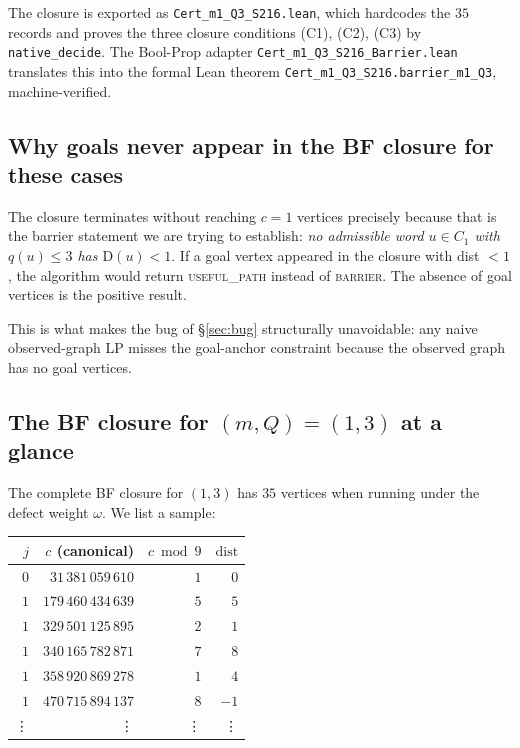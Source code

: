 \documentclass[11pt,a4paper]{article}
\theoremstyle{plain}
\theoremstyle{definition}
\newcommand{\defect}{\mathrm{D}}
\begin{document}
The closure is exported as
\texttt{Cert\_m1\_Q3\_S216.lean}, which hardcodes the $35$
records and proves the three closure conditions (C1), (C2), (C3)
by \texttt{native\_decide}. The Bool-Prop adapter
\texttt{Cert\_m1\_Q3\_S216\_Barrier.lean} translates this into
the formal Lean theorem
\texttt{Cert\_m1\_Q3\_S216.barrier\_m1\_Q3}, machine-verified.

\subsection{Why goals never appear in the BF closure for these cases}

The closure terminates without reaching $c = 1$ vertices precisely
because that is the barrier statement we are trying to establish:
\emph{no admissible word $u \in C_1$ with $q(u) \le 3$ has
$\defect(u) < 1$}. If a goal vertex appeared in the closure with
dist $< 1$, the algorithm would return \textsc{useful\_path}
instead of \textsc{barrier}. The absence of goal vertices is the
positive result.

This is what makes the bug of \S\ref{sec:bug} structurally
unavoidable: any naive observed-graph LP misses the goal-anchor
constraint because the observed graph has no goal vertices.

\subsection{The BF closure for $(m, Q) = (1, 3)$ at a glance}

The complete BF closure for $(1, 3)$ has $35$ vertices when
running under the defect weight $\omega$. We list a sample:

\begin{center}\footnotesize
\begin{tabular}{rrrr}
\toprule
$j$ & $c$ (canonical) & $c \bmod 9$ & $\mathrm{dist}$ \\
\midrule
$0$ & $31\,381\,059\,610$ & $1$ & $0$ \\
$1$ & $179\,460\,434\,639$ & $5$ & $5$ \\
$1$ & $329\,501\,125\,895$ & $2$ & $1$ \\
$1$ & $340\,165\,782\,871$ & $7$ & $8$ \\
$1$ & $358\,920\,869\,278$ & $1$ & $4$ \\
$1$ & $470\,715\,894\,137$ & $8$ & $-1$ \\
\vdots & \vdots & \vdots & \vdots \\
\bottomrule
\end{tabular}
\end{center}
\end{document}
